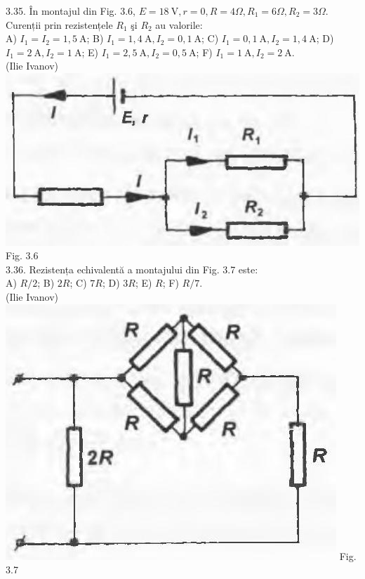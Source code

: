 \documentclass[10pt]{article}
\begin{document}
3.35. În montajul din Fig. 3.6, $E=18 \mathrm{~V}, r=0, R=4 \Omega, R_{1}=6 \Omega, R_{2}=3 \Omega$. Curenții prin rezistențele $R_{1}$ şi $R_{2}$ au valorile:\\ A) $I_{1}=I_{2}=1,5 \mathrm{~A}$; B) $I_{1}=1,4 \mathrm{~A} , I_{2}=0,1 \mathrm{~A}$; C) $I_{1}=0,1 \mathrm{~A} , I_{2}=1,4 \mathrm{~A}$; D) $I_{1}=2 \mathrm{~A} , I_{2}=1 \mathrm{~A}$; E) $I_{1}=2,5 \mathrm{~A} , I_{2}=0,5 \mathrm{~A}$; F) $I_{1}=1 \mathrm{~A} , I_{2}=2 \mathrm{~A}$.\\ (Ilie Ivanov)\\ \includegraphics[max width=\textwidth, center]{2025_07_01_5b3ff9fa0d508c8e9f17g-151} Fig. 3.6\\

3.36. Rezistența echivalentă a montajului din Fig. 3.7 este:\\ A) $R / 2$; B) $2 R$; C) $7 R$; D) $3 R$; E) $R$; F) $R / 7$.\\ (Ilie Ivanov)\\ \includegraphics[max width=\textwidth, center]{2025_07_01_5b3ff9fa0d508c8e9f17g-151(2)} Fig. 3.7\\
\end{document}
